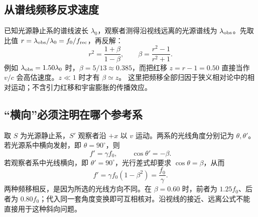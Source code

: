 \subsection{从谱线频移反求速度}
已知光源静止系的谱线波长 $\lambda_0$，观察者测得沿视线远离的光源谱线为 $\lambda_{\rm obs}$。先取比值 $r=\lambda_{\rm obs}/\lambda_0=f_0/f_{\rm rec}$，再反解：
\[
 r^2=\frac{1+\beta}{1-\beta},\qquad
 \beta=\frac{r^2-1}{r^2+1}.
\]
例如 $\lambda_{\rm obs}=1.50\lambda_0$ 时，$\beta=5/13\approx0.385$，而把红移 $z=r-1=0.50$ 直接当作 $v/c$ 会高估速度。$z\ll1$ 时才有 $\beta\simeq z$。
这里把频移全部归因于狭义相对论中的相对运动；不含引力红移和宇宙膨胀的传播效应。

\subsection{“横向”必须注明在哪个参考系}
取 $S$ 为光源静止系，$S'$ 观察者沿 $+x$ 以 $v$ 运动。两系的光线角度分别记为 $\theta,\theta'$。若光源系中横向发射，即 $\theta=90^\circ$，则
\[
 f'=\gamma f_0,\qquad \cos\theta'=-\beta.
\]
若观察者系中光线横向，即 $\theta'=90^\circ$，光行差式却要求 $\cos\theta=\beta$，从而
\[
 f'=\gamma f_0(1-\beta^2)=\frac{f_0}{\gamma}.
\]
两种频移相反，是因为所选的光线方向不同。在 $\beta=0.60$ 时，前者为 $1.25f_0$、后者为 $0.80f_0$；代入同一套角度变换即可互相核对。沿视线的接近、远离公式不能直接用于这种斜向问题。
